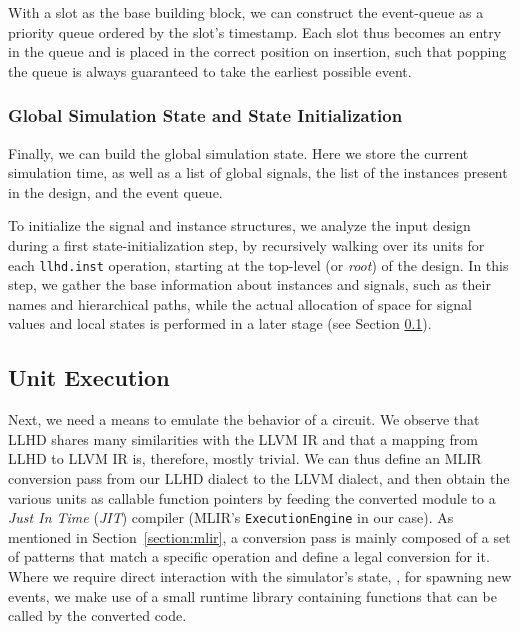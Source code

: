 With a slot as the base building block, we can construct the event-queue as a priority queue ordered by the slot's timestamp. Each slot thus becomes an entry in the queue and is placed in the correct position on insertion, such that popping the queue is always guaranteed to take the earliest possible event.


\subsubsection{Global Simulation State and State Initialization}
\label{sec:state}
Finally, we can build the global simulation state. Here we store the current simulation time, as well as a list of global signals, the list of the instances present in the design, and the event queue.

To initialize the signal and instance structures, we analyze the input design during a first state-initialization step, by recursively walking over its units for each \texttt{llhd.inst} operation, starting at the top-level (or \textit{root}) of the design. In this step, we gather the base information about instances and signals, such as their names and hierarchical paths, while the actual allocation of space for signal values and local states is performed in a later stage (see Section \ref{sec:execution}).


\subsection{Unit Execution}
\label{sec:execution}
Next, we need a means to emulate the behavior of a circuit. We observe that LLHD shares many similarities with the LLVM IR and that a mapping from LLHD to LLVM IR is, therefore, mostly trivial. We can thus define an MLIR conversion pass from our LLHD dialect to the LLVM dialect, and then obtain the various units as callable function pointers by feeding the converted module to a \textit{Just In Time} (\textit{JIT}) compiler (MLIR's \texttt{ExecutionEngine} in our case). As mentioned in Section~\ref{section:mlir}, a conversion pass is mainly composed of a set of patterns that match a specific operation and define a legal conversion for it. Where we require direct interaction with the simulator's state, \eg, for spawning new events, we make use of a small runtime library containing functions that can be called by the converted code.

